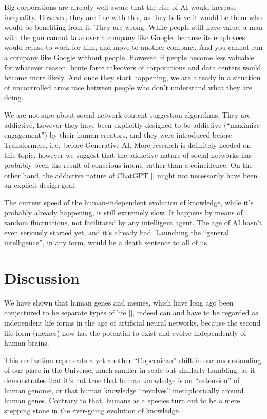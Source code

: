 \documentclass[12pt]{article}
\newcommand{\citestrut}[1]{\vphantom{[}{#1}\vphantom{]}}
\renewcommand{\cite}[1]{[\hyperlink{#1}{\citestrut{#1}}]}
\begin{document}
Big corporations are already well aware that the rise of AI would increase inequality.
However, they are fine with this, as they believe it would be them who would be
benefiting from it. They are wrong. While people still have value, a man with the gun
cannot take over a company like Google, because its employees would refuse to work for
him, and move to another company. And you cannot run a company like Google without
people. However, if people become less valuable for whatever reason, brute force
takeovers of corporations and data centers would become more likely. And once they start
happening, we are already in a situation of uncontrolled arms race between people who
don't understand what they are doing.

We are not sure about social network content suggestion algorithms. They are addictive,
however they have been explicitly designed to be addictive (``maximize engagement'') by
their human creators, and they were introduced before Transformers, i.\,e.\ before
Generative AI. More research is definitely needed on this topic, however we suggest that
the addictive nature of social networks has probably been the result of conscious intent,
rather than a coincidence. On the other hand, the addictive nature of ChatGPT
\cite{Addiction} might not necessarily have been an explicit design goal.

The current speed of the human-independent evolution of knowledge, while it's probably
already happening, is still extremely slow. It happens by means of random fluctuations,
not facilitated by any intelligent agent. The age of AI hasn't even seriously started
yet, and it's already bad. Launching the ``general intelligence'', in any form, would be
a death sentence to all of us.

\section{Discussion}

We have shown that human genes and memes, which have long ago been conjectured to be
separate types of life \cite{SelfishGene}, indeed can and have to be regarded as
independent life forms in the age of artificial neural networks, because the second life
form (memes) now has the potential to exist and evolve independently of human brains.

This realization represents a yet another ``Copernican'' shift in our understanding of
our place in the Universe, much smaller in scale but similarly humbling, as it
demonstrates that it's not true that human knowledge is an ``extension'' of human genome,
or that human knowledge ``revolves'' metaphorically around human genes. Contrary to that,
humans as a species turn out to be a mere stepping stone in the ever-going evolution of
knowledge.
\end{document}
